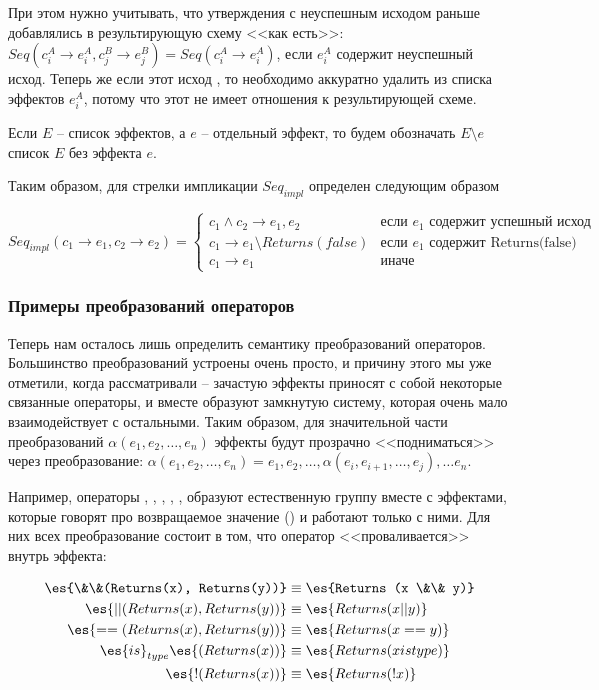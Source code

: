 При этом нужно учитывать, что утверждения с неуспешным исходом раньше добавлялись в результирующую схему <<как есть>>: $Seq(c^A_i \rightarrow e^A_i, c^B_j \rightarrow e^B_j) = Seq(c^A_i \rightarrow e^A_i)$, если $e^A_i$ содержит неуспешный исход. Теперь же если этот исход , то необходимо аккуратно удалить  из списка эффектов $e^A_i$, потому что этот  не имеет отношения к результирующей схеме. 

Если $E$ -- список эффектов, а $e$ -- отдельный эффект, то будем обозначать $E \setminus e$ список $E$ без эффекта $e$.

Таким образом, для стрелки импликации $Seq_{impl}$ определен следующим образом

\[
Seq_{impl}(c_1 \rightarrow e_1, c_2 \rightarrow e_2) = 
\begin{cases}
c_1 \land c_2 \rightarrow e_1, e_2 & \text{если } e_1 \text{ содержит успешный исход} \\
c_1 \rightarrow e_1 \setminus Returns(false) & \text{если } e_1 \text{ содержит Returns(false)} \\
c_1 \rightarrow e_1							 & \text{иначе}
\end{cases}
\]



\subsubsection{Примеры преобразований операторов}

Теперь нам осталось лишь определить семантику преобразований операторов. Большинство преобразований устроены очень просто, и причину этого мы уже отметили, когда рассматривали  -- зачастую эффекты приносят с собой некоторые связанные операторы, и вместе образуют замкнутую систему, которая очень мало взаимодействует с остальными. Таким образом, для значительной части преобразований $\alpha(e_1, e_2, \ldots, e_n)$ эффекты будут прозрачно <<подниматься>> через преобразование: $\alpha(e_1, e_2, \ldots, e_n) = e_1, e_2, \ldots, \alpha(e_i, e_{i + 1}, \ldots, e_j), \ldots e_n$.

Например, операторы \code{\&\&}, \code{||}, \code{==}, , \code{!},  образуют естественную группу вместе с эффектами, которые говорят про возвращаемое значение () и работают только с ними. Для них всех преобразование состоит в том, что оператор <<проваливается>> внутрь эффекта: 

\[
\begin{aligned}
	\es{\&\&(Returns(x), Returns(y))} & \equiv \es{Returns (x \&\& y)}    \\
	\es{||(Returns(x), Returns(y))}   & \equiv \es{Returns (x || y)}    \\
	\es{==(Returns(x), Returns(y))}   & \equiv \es{Returns (x == y)}    \\
	\es{is}_{type} \es{(Returns(x))}  & \equiv \es{Returns (x is type)} \\
	\es{!(Returns(x))} 				  & \equiv \es{Returns (!x)}
\end{aligned}
\]


